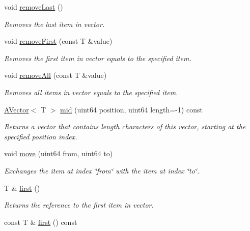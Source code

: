 \begin{DoxyCompactItemize}
\mbox{\label{class_a_vector_ad34deeefc2360e10c682d6b11831233a}} 
void \mbox{\hyperlink{class_a_vector_ad34deeefc2360e10c682d6b11831233a}{remove\+Last}} ()
\begin{DoxyCompactList}\small\item\em Removes the last item in vector. \end{DoxyCompactList}\item 
void \mbox{\hyperlink{class_a_vector_a33f1e98af680a5c9e430dc11beeb4dd8}{remove\+First}} (const T \&value)
\begin{DoxyCompactList}\small\item\em Removes the first item in vector equals to the specified item. \end{DoxyCompactList}\item 
void \mbox{\hyperlink{class_a_vector_a521f435b2b3c74c92d6cbe94bc3faddd}{remove\+All}} (const T \&value)
\begin{DoxyCompactList}\small\item\em Removes all items in vector equals to the specified item. \end{DoxyCompactList}\item 
\mbox{\hyperlink{class_a_vector}{A\+Vector}}$<$ T $>$ \mbox{\hyperlink{class_a_vector_ac0fd7bd21468b282eb563badd30f73f6}{mid}} (uint64 position, uint64 length=-\/1) const
\begin{DoxyCompactList}\small\item\em Returns a vector that contains length characters of this vector, starting at the specified position index. \end{DoxyCompactList}\item 
void \mbox{\hyperlink{class_a_vector_af045120312bc7a66ab31684bdbb039bd}{move}} (uint64 from, uint64 to)
\begin{DoxyCompactList}\small\item\em Exchanges the item at index \char`\"{}from\char`\"{} with the item at index \char`\"{}to\char`\"{}. \end{DoxyCompactList}\item 
T \& \mbox{\hyperlink{class_a_vector_a9ad79c8f2af06e68a9eb022cae0bb966}{first}} ()
\begin{DoxyCompactList}\small\item\em Returns the reference to the first item in vector. \end{DoxyCompactList}\item 
const T \& \mbox{\hyperlink{class_a_vector_a960abfbaf4b7b395286c82d79571147a}{first}} () const

\end{DoxyCompactItemize}
